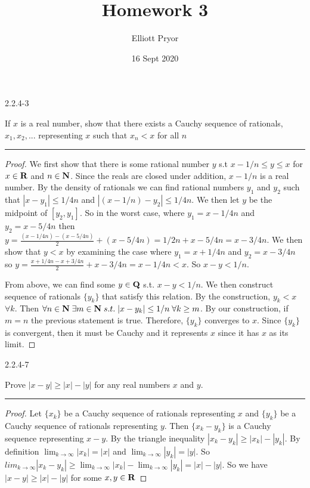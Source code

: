 \documentclass[11pt]{article}
\title{Homework 3}
\author{Elliott Pryor}
\date{16 Sept 2020}
\begin{document}
\maketitle



 2.2.4-3

If $x$ is a real number, show that there exists a Cauchy sequence of rationals, $x_1, x_2, ...$ representing $x$ such that $x_n < x$ for all $n$
\hrule

\begin{proof}


We first show that there is some rational number $y$ s.t $x-1/n \leq y \leq x$ for $x \in \mathbf{R}$ and $n \in \mathbf{N}$. Since the reals are closed under addition, $x - 1/n$ is a real number. By the density of rationals we can find rational numbers $y_1$ and $y_2$ such that $|x - y_1| \leq 1/4n$ and $|(x-1/n) - y_2| \leq 1/4n$. We then let $y$ be the midpoint of $[y_2, y_1]$.  So in the worst case, where $y_1 = x - 1/4n$ and $y_2 = x - 5/4n$ then $y = \frac{(x - 1/4n) - (x - 5/4n)}{2} + (x - 5/4n) = 1/2n + x - 5/4n = x - 3/4n$. 
We then show that $y < x$ by examining the case where $y_1 = x + 1/4n$ and $y_2 = x - 3/4n$ so $y = \frac{x + 1/4n - x + 3/4n}{2} +  x - 3/4n = x - 1/4n < x$.
So $x - y < 1/n$.

From above, we can find some $y \in \mathbf{Q}$ s.t. $x - y < 1/n$. We then construct sequence of rationals $\{y_k\}$ that satisfy this relation. By the construction, $y_k < x$ $\forall k$. Then $\forall n \in \mathbf{N} \; \exists m \in \mathbf{N} \; s.t. \; |x - y_k| \leq 1/n \; \forall k \geq m$. By our construction, if $m = n$ the previous statement is true. Therefore, $\{y_k\}$ converges to $x$. Since $\{y_k\}$ is convergent, then it must be Cauchy and it represents $x$ since it has $x$ as its limit.
\end{proof}




\newpage
{} 2.2.4-7

Prove $|x-y| \geq |x| - |y|$ for any real numbers $x$ and $y$.
\hrule


\begin{proof}

Let $\{x_k\}$ be a Cauchy sequence of rationals representing $x$ and $\{y_k\}$ be a Cauchy sequence of rationals representing $y$. Then $\{x_k - y_k\}$ is a Cauchy sequence representing $x - y$. By the triangle inequality $|x_k - y_k| \geq |x_k| - |y_k|$. By definition $\lim_{k \to \infty} |x_k| = |x|$ and $\lim_{k \to \infty} |y_k| = |y|$. So $lim_{k \to \infty} |x_k - y_k| \geq \lim_{k \to \infty} |x_k| - \lim_{k \to \infty} |y_k| = |x| - |y|$. So we have $|x - y| \geq |x| - |y|$ for some $x,y \in \mathbf{R}$

\end{proof}
\end{document}
